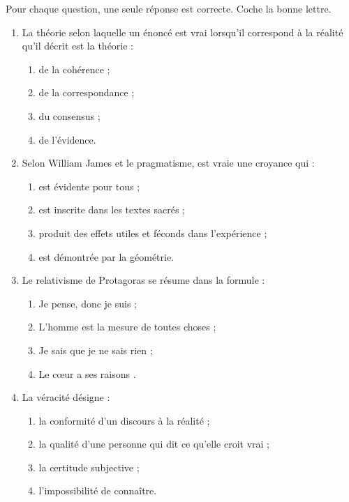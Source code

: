 \documentclass[11pt]{article}
\newcommand{\cle}[1]{{\popxbold\color{popdark}#1}}
\begin{document}
\begin{exercice}
Pour chaque question, une seule réponse est correcte. Coche la bonne lettre.
\begin{enumerate}
\item La théorie selon laquelle un énoncé est vrai lorsqu'il correspond à la réalité qu'il décrit est la théorie :
\begin{enumerate}
\item de la cohérence ; \item de la correspondance ; \item du consensus ; \item de l'évidence.
\end{enumerate}
\item Selon William James et le pragmatisme, est vraie une croyance qui :
\begin{enumerate}
\item est évidente pour tous ; \item est inscrite dans les textes sacrés ; \item produit des effets utiles et féconds dans l'expérience ; \item est démontrée par la géométrie.
\end{enumerate}
\item Le relativisme de Protagoras se résume dans la formule :
\begin{enumerate}
\item \guillemotleft Je pense, donc je suis \guillemotright ; \item \guillemotleft L'homme est la mesure de toutes choses \guillemotright ; \item \guillemotleft Je sais que je ne sais rien \guillemotright ; \item \guillemotleft Le cœur a ses raisons \guillemotright.
\end{enumerate}
\item La \cle{véracité} désigne :
\begin{enumerate}
\item la conformité d'un discours à la réalité ; \item la qualité d'une personne qui dit ce qu'elle croit vrai ; \item la certitude subjective ; \item l'impossibilité de connaître.
\end{enumerate}
\end{enumerate}
\end{exercice}
\end{document}
